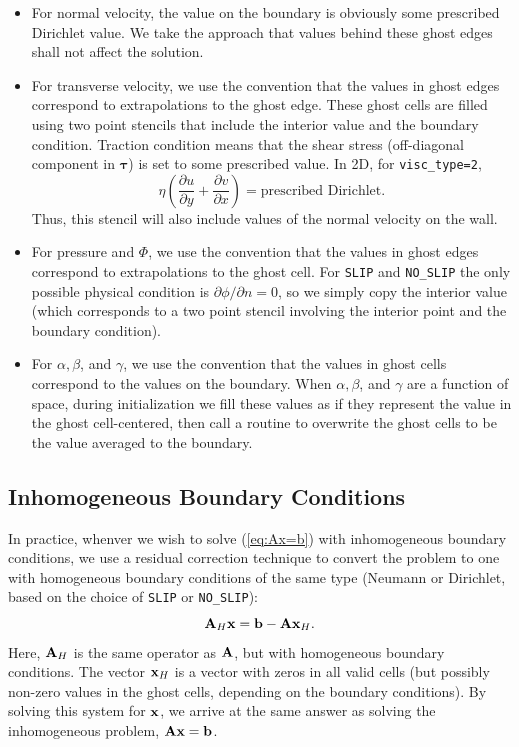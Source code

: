 \documentclass[final]{siamltex}
\def\Ab {{\bf A}}
\def\bb {{\bf b}}
\def\xb {{\bf x}}
\def\taub   {\boldsymbol{\tau}}
\begin{document}
\begin{itemize}

\item For normal velocity, the value on the boundary is obviously some prescribed Dirichlet
value.  We take the approach that values behind these ghost edges shall not affect
the solution.\\

\item For transverse velocity, we use the convention that the values in ghost edges correspond
to extrapolations to the ghost edge.  These ghost cells are filled using two point
stencils that include the interior value and the boundary condition.
Traction condition means that the shear stress (off-diagonal component in $\taub$)
is set to some prescribed value.  In 2D, for {\tt visc\_type=2},
\begin{equation}
\eta\left(\frac{\partial u}{\partial y} + \frac{\partial v}{\partial x}\right) = \text{prescribed Dirichlet}.
\end{equation}
Thus, this stencil will also include values of the normal velocity on the wall.

\item For pressure and $\Phi$, we use the convention that the values in ghost edges 
correspond to extrapolations to the ghost cell.  For {\tt SLIP} and {\tt NO\_SLIP} the only
possible physical condition is $\partial\phi/\partial n = 0$, so we simply copy
the interior value (which corresponds to a two point stencil involving the interior
point and the boundary condition).\\

\item For $\alpha, \beta$, and $\gamma$, we use the convention that the values in ghost cells
correspond to the values on the boundary.  When $\alpha, \beta$, and $\gamma$ are a
function of space, during initialization we fill these values as if they represent
the value in the ghost cell-centered, then call a routine to overwrite the ghost cells
to be the value averaged to the boundary.

\end{itemize}

\subsection{Inhomogeneous Boundary Conditions}
In practice, whenver we wish to solve (\ref{eq:Ax=b}) with inhomogeneous boundary
conditions, we use a residual correction technique to convert the problem to one
with homogeneous boundary conditions of the same type (Neumann or Dirichlet, based on the
choice of {\tt SLIP} or {\tt NO\_SLIP}):
\begin{equation}
\Ab_H\xb = \bb - \Ab\xb_H.
\end{equation}
Here, $\Ab_H$ is the same operator as $\Ab$, but with homogeneous boundary conditions.
The vector $\xb_H$ is a vector with zeros in all valid cells (but possibly
non-zero values in the ghost cells, depending on the boundary conditions).
By solving this system for $\xb$, we arrive at the same answer as solving the
inhomogeneous problem, $\Ab\xb=\bb$.
\end{document}
